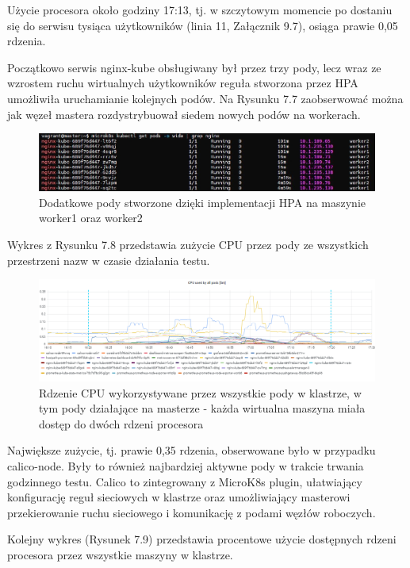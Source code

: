 Użycie procesora około godziny 17:13, tj. w szczytowym momencie po dostaniu się do serwisu tysiąca użytkowników (linia 11, Załącznik 9.7), osiąga prawie 0,05 rdzenia.

Początkowo serwis nginx-kube obsługiwany był przez trzy pody, lecz wraz ze wzrostem ruchu wirtualnych użytkowników reguła stworzona przez HPA umożliwiła uruchamianie kolejnych podów. Na Rysunku 7.7 zaobserwować można jak węzeł mastera rozdystrybuował siedem nowych podów na workerach.


\begin{figure}[H]
    \centering
    \includegraphics[width=1\textwidth]{img2/test1/nginx.jpg}
    \caption{Dodatkowe pody stworzone dzięki implementacji HPA na maszynie worker1 oraz worker2}
\end{figure}

Wykres z Rysunku 7.8 przedstawia zużycie CPU przez pody ze wszystkich przestrzeni nazw w czasie działania testu. 

\begin{figure}[H]
    \centering
    \includegraphics[width=1\textwidth]{img2/test1/cpu_allpods.png}
    \caption{Rdzenie CPU wykorzystywane przez wszystkie pody w klastrze, w tym pody działające na masterze - każda wirtualna maszyna miała dostęp do dwóch rdzeni procesora}
\end{figure}

Największe zużycie, tj. prawie 0,35 rdzenia, obserwowane było w przypadku calico-node. Były to również najbardziej aktywne pody w trakcie trwania godzinnego testu. Calico \cite{calico} to zintegrowany z MicroK8s plugin, ułatwiający konfigurację reguł sieciowych w klastrze oraz umożliwiający masterowi przekierowanie ruchu sieciowego i komunikację z podami węzłów roboczych.

Kolejny wykres (Rysunek 7.9) przedstawia procentowe użycie dostępnych rdzeni procesora przez wszystkie maszyny w klastrze. 

